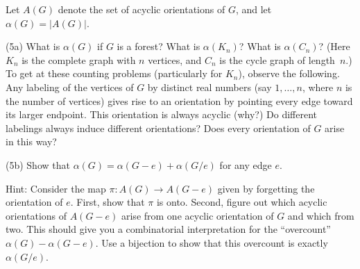 \begin{center}
\end{center}


Let $A(G)$ denote the set of acyclic orientations of $G$, and let $\alpha(G)=|A(G)|$.

(5a) What is $\alpha(G)$ if $G$ is a forest?  What is $\alpha(K_n)$?  What is $\alpha(C_n)$?  (Here $K_n$ is the complete graph with $n$ vertices, and
$C_n$ is the cycle graph of length~$n$.)
To get at these counting problems (particularly for $K_n$), observe the following.  Any labeling of the vertices of $G$ by distinct real numbers (say $1,\dots,n$, where $n$ is the number of vertices) gives rise to an orientation by pointing every edge toward its larger endpoint.  This orientation is always acyclic (why?)  Do different labelings always induce different orientations?  Does every orientation of $G$ arise in this way?

(5b) Show that $\alpha(G)=\alpha(G-e)+\alpha(G/e)$ for any edge $e$.

Hint: Consider the map $\pi:A(G)\to A(G-e)$ given by forgetting the orientation of $e$.  First, show that $\pi$ is onto.  Second, figure out which acyclic orientations of $A(G-e)$ arise from one acyclic orientation of $G$ and which from two.  This should give you a combinatorial interpretation for the ``overcount'' $\alpha(G)-\alpha(G-e)$.  Use a bijection to show that this overcount is exactly $\alpha(G/e)$.


